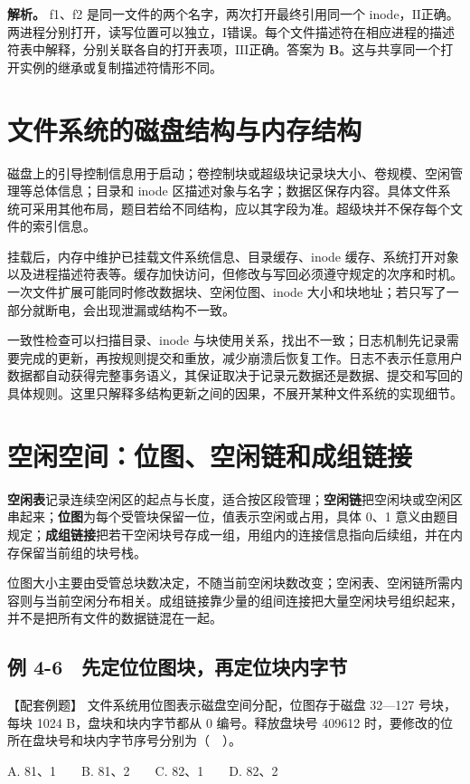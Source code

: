 \textbf{解析。} f1、f2 是同一文件的两个名字，两次打开最终引用同一个 inode，\ensuremath{\mathrm{II}}正确。两进程分别打开，读写位置可以独立，\ensuremath{\mathrm{I}}错误。每个文件描述符在相应进程的描述符表中解释，分别关联各自的打开表项，\ensuremath{\mathrm{III}}正确。答案为 \textbf{B}。这与共享同一个打开实例的继承或复制描述符情形不同。

\section{文件系统的磁盘结构与内存结构}\label{OS04-6-8}

磁盘上的引导控制信息用于启动；卷控制块或超级块记录块大小、卷规模、空闲管理等总体信息；目录和 inode 区描述对象与名字；数据区保存内容。具体文件系统可采用其他布局，题目若给不同结构，应以其字段为准。超级块并不保存每个文件的索引信息。

挂载后，内存中维护已挂载文件系统信息、目录缓存、inode 缓存、系统打开对象以及进程描述符表等。缓存加快访问，但修改与写回必须遵守规定的次序和时机。一次文件扩展可能同时修改数据块、空闲位图、inode 大小和块地址；若只写了一部分就断电，会出现泄漏或结构不一致。

一致性检查可以扫描目录、inode 与块使用关系，找出不一致；日志机制先记录需要完成的更新，再按规则提交和重放，减少崩溃后恢复工作。日志不表示任意用户数据都自动获得完整事务语义，其保证取决于记录元数据还是数据、提交和写回的具体规则。这里只解释多结构更新之间的因果，不展开某种文件系统的实现细节。

\section{空闲空间：位图、空闲链和成组链接}\label{OS04-6-9}

\textbf{空闲表}记录连续空闲区的起点与长度，适合按区段管理；\textbf{空闲链}把空闲块或空闲区串起来；\textbf{位图}为每个受管块保留一位，值表示空闲或占用，具体 0、1 意义由题目规定；\textbf{成组链接}把若干空闲块号存成一组，用组内的连接信息指向后续组，并在内存保留当前组的块号栈。

位图大小主要由受管总块数决定，不随当前空闲块数改变；空闲表、空闲链所需内容则与当前空闲分布相关。成组链接靠少量的组间连接把大量空闲块号组织起来，并不是把所有文件的数据链混在一起。

\subsection{例 4-6　先定位位图块，再定位块内字节}\label{OS04-ex6-6}

\begin{example}[配套例题]

【配套例题】 文件系统用位图表示磁盘空间分配，位图存于磁盘 32---127 号块，每块 1024 B，盘块和块内字节都从 0 编号。释放盘块号 409612 时，要修改的位所在盘块号和块内字节序号分别为（　）。

A. 81、1　　B. 81、2　　C. 82、1　　D. 82、2

\end{example}

